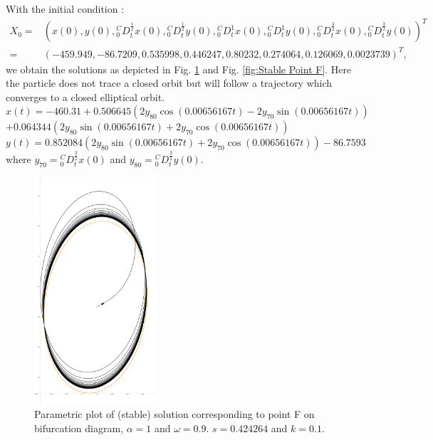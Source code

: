 \documentclass[pdflatex,sn-mathphys]{sn-jnl}%
\theoremstyle{thmstyleone}%
\theoremstyle{thmstyletwo}%
\theoremstyle{thmstylethree}%
\begin{document}
With the initial condition : \begin{align*}
X_{0}=&
\left(
x(0) ,
y(0) ,
{ }_{0}^{C}D_{t}^{\frac{1}{2}}x(0) ,
{ }_{0}^{C}D_{t}^{\frac{1}{2}}y(0) ,
{ }_{0}^{C}D_{t}^{1} x(0) ,
{ }_{0}^{C}D_{t}^{1}y(0) ,
{ }_{0}^{C}D_{t}^{\frac{3}{2}}x(0) ,
{ }_{0}^{C}D_{t}^{\frac{3}{2}}y(0)
\right)^T \\ =& \left(
 -459.949,
 -86.7209,
 0.535998,
 0.446247,
 0.80232,
 0.274064,
 0.126069,
 0.0023739 
 \right)^T,
\end{align*}
we obtain the solutions as depicted in Fig. \ref{fig: Stable parametric Point F} and Fig. \ref{fig:Stable  Point F}. Here the particle does not trace a closed orbit but will follow a trajectory which converges to a closed elliptical orbit. \\
$ x(t)=-460.31+0.506645 \left(2 y_{80} \cos (0.00656167 t)-2 y_{70} \sin (0.00656167 t)\right)$\\       \quad \quad $+0.064344 \left(2 y_{80} \sin (0.00656167 t)+2 y_{70} \cos (0.00656167 t)\right) $\\
$  y(t)=0.852084 \left(2 y_{80} \sin (0.00656167 t)+2 y_{70} \cos (0.00656167 t)\right)-86.7593$ \\ where $y_{70}={ }_{0}^{C}D_{t}^{\frac{3}{2}}x(0)$ and $y_{80}={ }_{0}^{C}D_{t}^{\frac{3}{2}}y(0)$.
  \begin{figure}
  \centering
    \includegraphics[width=0.4\textwidth]{ais1orbitpara}
    \caption{Parametric plot of (stable) solution corresponding to point F on bifurcation diagram, $\alpha = 1$ and $\omega=0.9$. $s=0.424264$ and $k=0.1$.}
    \label{fig: Stable parametric Point F}   
\end{figure}
\end{document}
